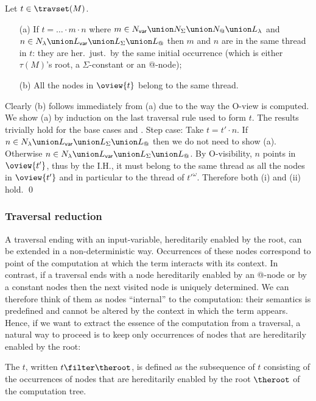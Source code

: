 \begin{lemma}
\label{lem:trav_oview_single_threaded}
Let $t \in \travset(M)$.
\begin{itemize}
\item[(a)] If $t= \ldots \cdot m \cdot n$ where
$m\in N_{\sf var} \union N_\Sigma \union N_@ \union
L_\lambda$ and $n\in N_\lambda \union L_{\sf var}
\union L_\Sigma \union L_@$ then
$m$ and $n$ are in the same thread in $t$: they are her.\ just.\ by the same initial occurrence (which is either $\tau(M)$'s root, a $\Sigma$-constant or an @-node);

\item[(b)] All the nodes in $\oview{t}$ belong to the same thread.
\end{itemize}
\end{lemma}
\proof
Clearly (b) follows immediately from (a) due to the way the O-view is computed. We show (a) by induction on the last traversal rule used to form $t$. The results trivially hold for the base cases  and .
Step case: Take $t = t' \cdot n$. If $n \in N_\lambda\union L_{\sf var} \union L_\Sigma \union L_@$ then we do not need to show (a).
Otherwise $n \in  N_\lambda \union L_{\sf var} \union L_\Sigma \union L_@$. By O-visibility, $n$ points in $\oview{t'}$, thus by the I.H., it must belong to the same thread as all the nodes in $\oview{t'}$ and in particular to the thread of $t'^\omega$. Therefore both (i) and (ii) hold.
\qed


\subsubsection{Traversal reduction}


A traversal ending with an input-variable, \ie hereditarily enabled by the root, can be extended in a non-deterministic way. Occurrences of these nodes correspond to point of the computation at which the term interacts with its context. In contrast, if a traversal ends with a node hereditarily enabled by an @-node or by a constant nodes then the next visited node is uniquely determined. We can therefore think of them as nodes ``internal'' to the computation: their semantics is predefined and cannot be altered by the context in which the term appears. Hence, if we want to extract the essence of the computation from a traversal, a natural way to proceed is to keep only occurrences of nodes that are hereditarily enabled by the root:
\begin{definition}
The  $t$, written $t\filter \theroot$, is defined as the subsequence of $t$ consisting of the occurrences of nodes that are hereditarily enabled by the root $\theroot$ of the computation tree.
\end{definition}


